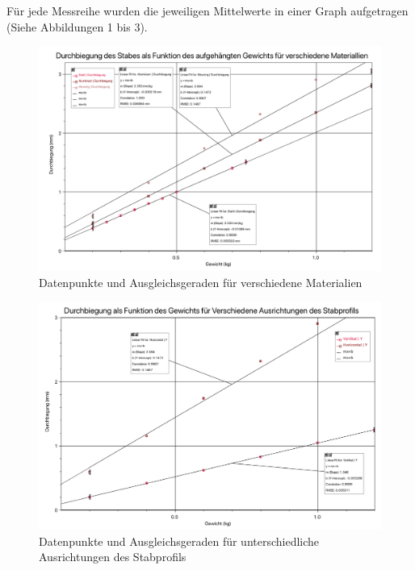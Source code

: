 \documentclass[11pt,a4paper]{article}
\begin{document}
Für jede Messreihe wurden die jeweiligen Mittelwerte in einer Graph aufgetragen (Siehe Abbildungen 1 bis 3). 

\begin{figure}[h]
	\centering
	\includegraphics[width=\linewidth]{Abb2}
	\caption{Datenpunkte und Ausgleichsgeraden für verschiedene Materialien}
\end{figure}

\begin{figure}[h]
	\centering
	\includegraphics[width=\linewidth]{Abb3}
	\caption{Datenpunkte und Ausgleichsgeraden für unterschiedliche Ausrichtungen des Stabprofils}
\end{figure}
\end{document}
